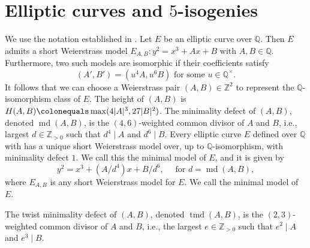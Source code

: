 \documentclass[12pt]{amsart}
\numberwithin{equation}{section} %
\theoremstyle{definition} \newtheorem{definition}[counter]{Definition}
\theoremstyle{remark} \newtheorem{nonexam}[counter]{Non-example}
\newcommand{\ZZ}{\mathbb{Z}} %
\newcommand{\QQ}{\mathbb{Q}} %
\newcommand{\unit}{^{\times}} %
\newcommand{\cdef}[1]{\textsf{#1}} %
\DeclareMathOperator{\mind}{md} %
\DeclareMathOperator{\twmind}{tmd} %
\begin{document}
\section{Elliptic curves and $5$-isogenies}
\label{sec:elliptic-curves-5isog}

We use the notation established in \cite{MV22}. Let $E$ be an elliptic curve
over $\QQ$. Then $E$ admits a short Weierstrass model $E_{A,B}\colon y^2 = x^3
+ Ax + B$ with $A,B \in \QQ$. Furthermore, two such models are isomorphic if
their coefficients satisfy
\begin{equation*}
  (A', B') = (u^4A, u^6B) \text{ for some } u \in \QQ\unit.
\end{equation*}
It follows that we can choose a Weierstrass pair $(A,B) \in \ZZ^2$ to represent
the $\QQ$-isomorphism class of $E$. The \cdef{height} of $(A,B)$ is
$H(A,B) \colonequals \max(4|A|^3, 27|B|^2)$. The \cdef{minimality defect} of
$(A,B)$, denoted $\mind(A,B)$, is the $(4,6)$-weighted common divisor of $A$
and $B$, i.e., largest $d \in \ZZ_{>0}$ such that $d^4 \mid A$ and
$d^6 \mid B$. Every elliptic curve $E$ defined over $\QQ$ with has a unique
short Weierstrass model over, up to $\QQ$-isomorphism, with minimality defect
$1$. We call this the \cdef{minimal model} of $E$, and it is given by
\begin{equation}
    \label{eq:minimal-model}
    y^2 = x^3 + (A/d^4)x + B/d^6, \quad \text{ for } d = \mind(A,B),
\end{equation}
where $E_{A,B}$ is any short Weierstrass model for $E$. We call
 the \cdef{minimal model} of $E$.




The \cdef{twist minimality defect} of
$(A,B)$, denoted $\twmind(A,B)$, is the $(2,3)$-weighted common divisor of $A$
and $B$, i.e., the largest $e \in \ZZ_{>0}$ such that $e^2 \mid A$ and
$e^3 \mid B$.
\end{document}

